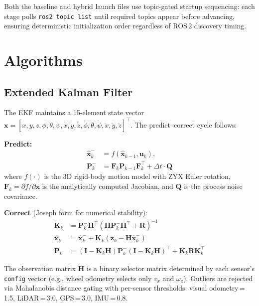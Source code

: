 \documentclass[conference]{IEEEtran}
\begin{document}
Both the baseline and hybrid launch files use topic-gated startup sequencing: each
stage polls \texttt{ros2 topic list} until required topics appear before advancing,
ensuring deterministic initialization order regardless of ROS\,2 discovery timing.

\section{Algorithms}

\subsection{Extended Kalman Filter}

The EKF maintains a 15-element state vector
$\mathbf{x} = [x, y, z, \phi, \theta, \psi, \dot{x}, \dot{y}, \dot{z}, \dot{\phi},
\dot{\theta}, \dot{\psi}, \ddot{x}, \ddot{y}, \ddot{z}]^\top$.
The predict--correct cycle follows:

\noindent\textbf{Predict:}
\begin{align}
\hat{\mathbf{x}}_k^- &= f(\hat{\mathbf{x}}_{k-1}, \mathbf{u}_k), \\
\mathbf{P}_k^- &= \mathbf{F}_k \mathbf{P}_{k-1} \mathbf{F}_k^\top + \Delta t \cdot \mathbf{Q}
\end{align}
where $f(\cdot)$ is the 3D rigid-body motion model with ZYX Euler rotation,
$\mathbf{F}_k = \partial f / \partial \mathbf{x}$ is the analytically computed
Jacobian, and $\mathbf{Q}$ is the process noise covariance.

\noindent\textbf{Correct} (Joseph form for numerical stability):
\begin{align}
\mathbf{K}_k &= \mathbf{P}_k^- \mathbf{H}^\top
               (\mathbf{H}\mathbf{P}_k^-\mathbf{H}^\top + \mathbf{R})^{-1} \\
\hat{\mathbf{x}}_k &= \hat{\mathbf{x}}_k^- +
               \mathbf{K}_k(\mathbf{z}_k - \mathbf{H}\hat{\mathbf{x}}_k^-) \\
\mathbf{P}_k &= (\mathbf{I} - \mathbf{K}_k\mathbf{H})\mathbf{P}_k^-
               (\mathbf{I} - \mathbf{K}_k\mathbf{H})^\top
               + \mathbf{K}_k\mathbf{R}\mathbf{K}_k^\top
\end{align}

The observation matrix $\mathbf{H}$ is a binary selector matrix determined by each
sensor's \texttt{config} vector (e.g., wheel odometry selects only $v_x$ and
$\omega_z$). Outliers are rejected via Mahalanobis distance gating with per-sensor
thresholds: visual odometry\,=\,1.5, LiDAR\,=\,3.0, GPS\,=\,3.0, IMU\,=\,0.8.
\end{document}
